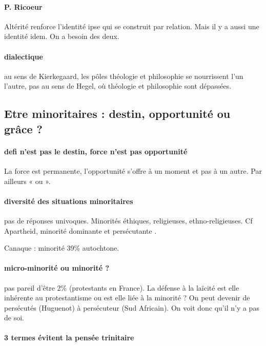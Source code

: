 \paragraph{P. Ricoeur} Altérité renforce l’identité ipse qui se construit par relation. Mais il y a aussi une identité idem. On a besoin des deux.
\paragraph{dialectique} au sens de Kierkegaard, les pôles théologie et philosophie se nourrissent l’un l’autre, pas au sens de Hegel, où théologie et philosophie sont dépassées.  
\subsection{Etre minoritaires : destin, opportunité ou grâce ? }
\paragraph{defi n’est pas le destin, force n’est pas opportunité} La force est permanente, l’opportunité s’offre à un moment et pas à un autre. Par ailleurs « ou ».
\paragraph{diversité des situations minoritaires} pas de réponses univoques. Minorités éthiques, religieuses, ethno-religieuses. Cf Apartheid, minorité dominante et persécutante .
\begin{Ex}
Canaque : minorité 39\% autochtone.
\end{Ex}
\paragraph{micro-minorité ou minorité ?} pas pareil d’être 2\% (protestants en France). La défense  à la laïcité est elle inhérente au protestantisme ou est elle liée à la minorité ?
On peut devenir de persécutés (Huguenot) à persécuteur (Sud Africain).
On voit donc qu’il n’y a pas de soi.

\paragraph{3 termes évitent la pensée trinitaire}

